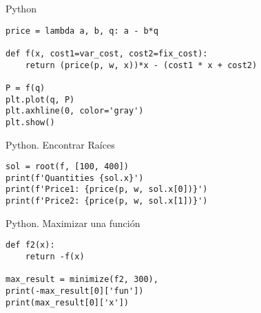 \begin{frame}[fragile]{Python}

  \begin{lstlisting}
price = lambda a, b, q: a - b*q
    
def f(x, cost1=var_cost, cost2=fix_cost):
    return (price(p, w, x))*x - (cost1 * x + cost2)

P = f(q)
plt.plot(q, P)
plt.axhline(0, color='gray')
plt.show()
  \end{lstlisting}
\end{frame}

\begin{frame}[fragile]{Python. Encontrar Raíces}

  \begin{lstlisting}
sol = root(f, [100, 400])
print(f'Quantities {sol.x}')
print(f'Price1: {price(p, w, sol.x[0])}')
print(f'Price2: {price(p, w, sol.x[1])}')
  \end{lstlisting}
\end{frame}


\begin{frame}[fragile]{Python. Maximizar una función}

  \begin{lstlisting}
def f2(x):
    return -f(x)

max_result = minimize(f2, 300),
print(-max_result[0]['fun'])
print(max_result[0]['x'])
  \end{lstlisting}
\end{frame}


